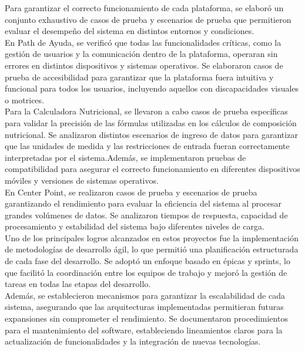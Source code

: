 \documentclass[12pt,letterpaper,spanish, xcolor=table]{report}
\numberwithin{figure}{subsection}
\begin{document}
	Para garantizar el correcto funcionamiento de cada plataforma, se elaboró un conjunto exhaustivo de casos de prueba y escenarios de prueba que permitieron evaluar el desempeño del sistema en distintos entornos y condiciones.\\
	
	En Path de Ayuda, se verificó que todas las funcionalidades críticas, como la gestión de usuarios y la comunicación dentro de la plataforma, operaran sin errores en distintos dispositivos y sistemas operativos. Se elaboraron casos de prueba de accesibilidad para garantizar que la plataforma fuera intuitiva y funcional para todos los usuarios, incluyendo aquellos con discapacidades visuales o motrices.\\
	
	Para la Calculadora Nutricional, se llevaron a cabo casos de prueba específicas para validar la precisión de las fórmulas utilizadas en los cálculos de composición nutricional. Se analizaron distintos escenarios de ingreso de datos para garantizar que las unidades de medida y las restricciones de entrada fueran correctamente interpretadas por el sistema.Además, se implementaron pruebas de compatibilidad para asegurar el correcto funcionamiento en diferentes dispositivos móviles y versiones de sistemas operativos.\\
	 
	En Center Point, se realizaron casos de prueba y escenarios de prueba garantizando el rendimiento para evaluar la eficiencia del sistema al procesar grandes volúmenes de datos. Se analizaron tiempos de respuesta, capacidad de procesamiento y estabilidad del sistema bajo diferentes niveles de carga.\\
	
	Uno de los principales logros alcanzados en estos proyectos fue la implementación de metodologías de desarrollo ágil, lo que permitió una planificación estructurada de cada fase del desarrollo. Se adoptó un enfoque basado en épicas y sprints, lo que facilitó la coordinación entre los equipos de trabajo y mejoró la gestión de tareas en todas las etapas del desarrollo.\\
	
	Además, se establecieron mecanismos para garantizar la escalabilidad de cada sistema, asegurando que las arquitecturas implementadas permitieran futuras expansiones sin comprometer el rendimiento. Se documentaron procedimientos para el mantenimiento del software, estableciendo lineamientos claros para la actualización de funcionalidades y la 
	integración de nuevas tecnologías.\\
	
\end{document}
